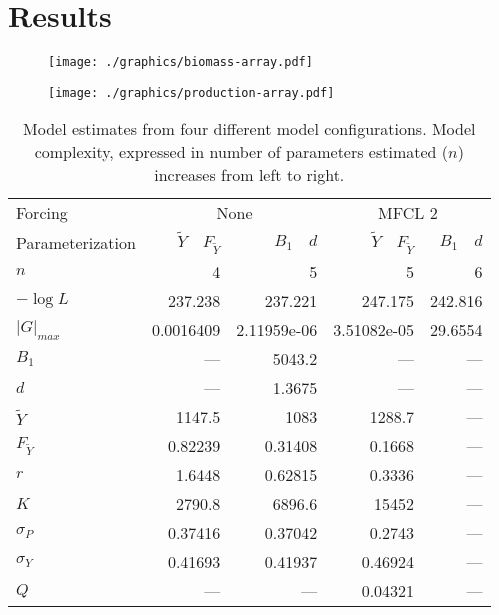 \documentclass[12pt,letterpaper,twoside]{article}
\newcommand\MSY{\tilde{Y}}
\newcommand\Fmsy{F_{\MSY}}
\begin{document}
\section{Results}

\begin{figure}
\begin{center}
\texttt{[image: ./graphics/biomass-array.pdf]}
\caption{\label{fig:estbiomass}
}
\end{center}
\end{figure}

\begin{figure}
\begin{center}
\texttt{[image: ./graphics/production-array.pdf]}
\caption{\label{fig:estprod}
}
\end{center}
\end{figure}

\begin{table}
\caption{Model estimates from four different model configurations.
Model complexity, expressed in number of parameters estimated ($n$)
increases from left to right.
\label{tag:ests4}}
\begin{center}
\begin{tabular}{lrrrr}
\hline
Forcing & \multicolumn{2}{c}{None}&\multicolumn{2}{c}{MFCL 2}\\
\cline{2-3}\cline{4-5}
Parameterization&$\MSY\quad\Fmsy$&$B_1\quad d$&$\MSY\quad\Fmsy$&$B_1\quad d$\\
\hline
\hline
$n$ & 4 & 5 & 5 & 6\\
$-\log L$ & 237.238 & 237.221 & 247.175 & 242.816\\
$|G|_{max}$ & 0.0016409 & 2.11959e-06 & 3.51082e-05 & 29.6554\\
$B_1$ & --- & 5043.2 & --- & ---\\
$d$ & --- & 1.3675 & --- & ---\\
$\MSY$ & 1147.5 & 1083 & 1288.7 & ---\\
$\Fmsy$ & 0.82239 & 0.31408 & 0.1668 & ---\\
$r$ & 1.6448 & 0.62815 & 0.3336 & ---\\
$K$ & 2790.8 & 6896.6 & 15452 & ---\\
$\sigma_P$ & 0.37416 & 0.37042 & 0.2743 & ---\\
$\sigma_Y$ & 0.41693 & 0.41937 & 0.46924 & ---\\
$Q$ & --- & --- & 0.04321 & ---\\
\hline
\end{tabular}
\end{center}
\end{table}
\end{document}
